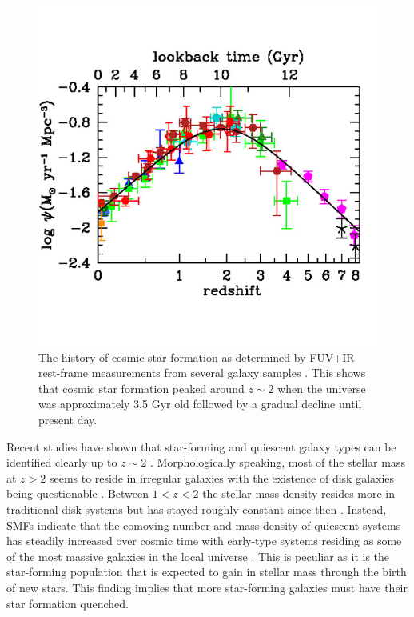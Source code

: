 \begin{figure}
\centering
\includegraphics[width=5in]{Figures/MadauDickinson2014.jpg}
\caption[The history of cosmic star formation.]{The history of cosmic star formation as determined by FUV+IR rest-frame measurements from several galaxy samples \citep[credit:][and references therein]{Madau2014}. This shows that cosmic star formation peaked around $z\sim2$ when the universe was approximately 3.5 Gyr old followed by a gradual decline until present day.}
\label{fig: SFR density}
\end{figure}

Recent studies have shown that star-forming and quiescent galaxy types can be identified clearly up to $z\sim2$ \citep{Brammer2011, Muzzin2013}. Morphologically speaking, most of the stellar mass at $z>2$ seems to reside in irregular galaxies with the existence of disk galaxies being questionable \citep{Dickinson2000,Papovich2005,Cameron2011,Conselice2005,Conselice2011,Buitrago2013}.  Between $1<z<2$ the stellar mass density resides more in traditional disk systems but has stayed roughly constant since then \citep{Bell2004,Brammer2011,Faber2007,Muzzin2013}. Instead, SMFs indicate that the comoving number and mass density of quiescent systems has steadily increased over cosmic time with early-type systems residing as some of the most massive galaxies in the local universe \citep{Brinchmann2000, Bell2003, Bundy2005, Mortlock2013, Kelvin2014, HuertasCompany2016, Thanjavur2016}. This is peculiar as it is the star-forming population that is expected to gain in stellar mass through the birth of new stars. This finding implies that more star-forming galaxies must have their star formation quenched. 

